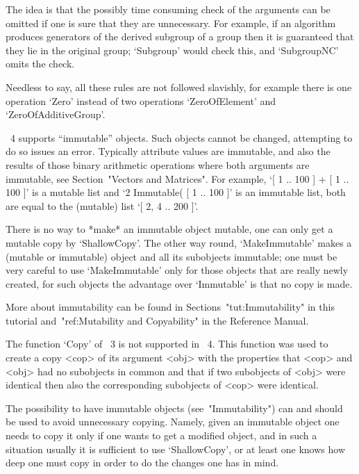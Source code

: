 The idea is that the possibly time consuming check of the arguments
can be omitted if one is sure that they are unnecessary.
For example, if an algorithm produces generators of the derived subgroup
of a group then it is guaranteed that they lie in the original group;
`Subgroup' would check this, and `SubgroupNC' omits the check.

Needless to say, all these rules are not followed slavishly,
for example there is one operation `Zero' instead of two operations
`ZeroOfElement' and `ZeroOfAdditiveGroup'.



{\GAP}~4 supports ``immutable'' objects.
Such objects cannot be changed, attempting to do so issues an error.
Typically attribute values are immutable,
and also the results of those binary arithmetic operations where
both arguments are immutable,
see Section~"Vectors and Matrices".
For example, `[ 1 .. 100 ] + [ 1 .. 100 ]' is a mutable list
and `2 \* Immutable( [ 1 .. 100 ]' is an immutable list,
both are equal to the (mutable) list `[ 2, 4 .. 200 ]'.

There is no way to *make* an immutable object mutable,
one can only get a mutable copy by `ShallowCopy'.
The other way round, `MakeImmutable' makes a (mutable or immutable)
object and all its subobjects immutable;
one must be very careful to use `MakeImmutable' only for those objects
that are really newly created,
for such objects the advantage over `Immutable' is that no copy is
made.

More about immutability can be found in Sections~"tut:Immutability"
in this tutorial
and~"ref:Mutability and Copyability" in the Reference Manual.



The function `Copy' of {\GAP}~3 is not supported in {\GAP}~4.
This function was used to create a copy <cop> of its argument <obj> with
the properties that <cop> and <obj> had no subobjects in common and that
if two subobjects of <obj> were identical then also the corresponding
subobjects of <cop> were identical.

The possibility to have immutable objects (see~"Immutability") can and
should be used to avoid unnecessary copying.
Namely, given an immutable object one needs to copy it only if one wants
to get a modified object, and in such a situation usually it is
sufficient to use `ShallowCopy', or at least one knows how deep one must
copy in order to do the changes one has in mind.

